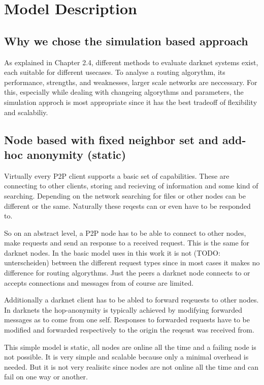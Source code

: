 \chapter{Model Description}

\section{Why we chose the simulation based approach}

As explained in Chapter 2.4, different methods to evaluate darknet systems exist, each suitable for different usecases. To analyse a routing algorythm, its performance, strengths, and weaknesses, larger scale networks are neccessary. For this, especially while dealing with changeing algorythms and parameters, the simulation approch is most appropriate since it has the best tradeoff of flexibility and scalabiliy.

\section{Node based with fixed neighbor set and add-hoc anonymity (static)}

Virtually every P2P client supports a basic set of capabilities. These are connecting to other clients, storing and recieving of information and some kind of searching. Depending on the network searching for files or other nodes can be different or the same. Naturally these reqests can or even have to be responded to.

So on an abstract level, a P2P node has to be able to connect to other nodes, make requests and send an response to a received request. This is the same for darknet nodes. In the basic model uses in this work it is not (TODO: unterscheiden) between the different request types since in most cases it makes no difference for routing algorythms. Just the peers a darknet node connects to or accepts connections and messages from of course are limited.

Additionally a darknet client has to be abled to forward reqeuests to other nodes. In darknets the hop-anonymity is typically achieved by modifying forwarded messages as to come from one self. Responses to forwarded requests have to be modified and forwarded respectively to the origin the reqeust was received from.

This simple model is static, all nodes are online all the time and a failing node is not possible. It is very simple and scalable because only a minimal overhead is needed. But it is not very realisitc since nodes are not online all the time and can fail on one way or another.

